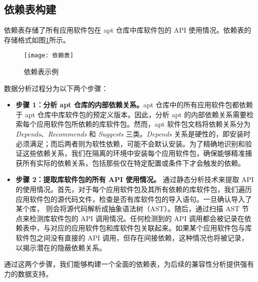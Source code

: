 \subsection{依赖表构建}\label{4.1.2}
依赖表存储了所有应用软件包在 apt 仓库中库软件包的 API 使用情况。依赖表的存储格式如图\ref{fig:dependency}所示。
\begin{figure}[htbp] %
	\centering
	\texttt{[image: 依赖表]}
	\caption{依赖表示例}
	\label{fig:dependency}
\end{figure}
数据分析过程分为以下两个步骤：
\begin{itemize}
	\item \textbf{步骤 1：分析 apt 仓库的内部依赖关系。}apt 仓库中的所有应用软件包都依赖于 apt 仓库中库软件包的预定义版本。因此，分析 apt 的内部依赖关系需要检索每个应用软件包所依赖的库软件包。然而，apt 软件包文档将依赖关系分为 \textit{Depends}、\textit{Recommends} 和 \textit{Suggests} 三类。\textit{Depends} 关系是硬性的，即安装时必须满足；而后两者则为软性依赖，可能不会默认安装。为了精确地识别和验证这些依赖关系，我们在隔离的环境中安装每个应用软件包，确保能够精准捕获所有实际的依赖关系，包括那些仅在特定配置或条件下才会触发的依赖。
	\item \textbf{步骤 2：提取库软件包的所有 API 使用情况。}\tool{} 通过静态分析技术来提取 API 的使用情况。首先，对于每个应用软件包及其所有依赖的库软件包，我们遍历应用软件包的源代码文件，检查是否有库软件包的导入语句。一旦确认导入了某个库，\tool{} 则会将源代码解析成抽象语法树（AST）。随后，通过扫描 AST 节点来检测库软件包的 API 调用情况。任何检测到的 API 调用都会被记录在依赖表中，与对应的应用软件包和库软件包关联起来。如果某个应用软件包与库软件包之间没有直接的 API 调用，但存在间接依赖，这种情况也将被记录，以揭示潜在的隐蔽依赖关系。
\end{itemize}
通过这两个步骤，我们能够构建一个全面的依赖表，为后续的兼容性分析提供强有力的数据支持。

